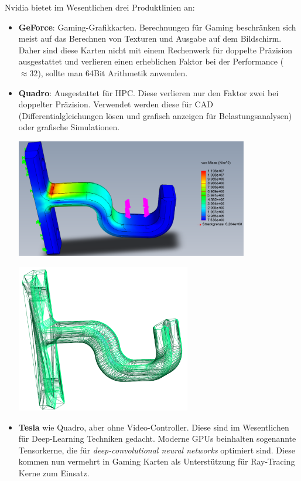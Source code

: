 		Nvidia bietet im Wesentlichen drei Produktlinien an:
		\begin{itemize}
		    \item \textbf{GeForce}: Gaming-Grafikkarten. Berechnungen für Gaming beschränken sich meist auf das Berechnen von Texturen und Ausgabe auf dem Bildschirm. Daher sind diese Karten nicht mit einem Rechenwerk für doppelte Präzision ausgestattet und verlieren einen erheblichen Faktor bei der Performance ($\approx 32$), sollte man 64Bit Arithmetik anwenden.
		    
		    \newpage
		
		    \item \textbf{Quadro}: Ausgestattet für HPC. Diese verlieren nur den Faktor zwei bei doppelter Präzision. Verwendet werden diese für CAD (Differentialgleichungen lösen und grafisch anzeigen für Belastungsanalysen) oder grafische Simulationen.
		    
		    \begin{center}
		    \includegraphics[width=0.8\textwidth]{chapter2/pictures/haken.pdf}
		    
		    \includegraphics[width=0.6\textwidth]{chapter2/pictures/mesh.pdf}
		    \end{center}

		    \item \textbf{Tesla} wie Quadro, aber ohne Video-Controller. Diese sind im Wesentlichen für Deep-Learning Techniken gedacht. Moderne GPUs beinhalten sogenannte Tensorkerne, die für \textit{deep-convolutional neural networks} optimiert sind. Diese kommen nun vermehrt in Gaming Karten als Unterstützung für Ray-Tracing Kerne zum Einsatz.
		\end{itemize}		 		
		
